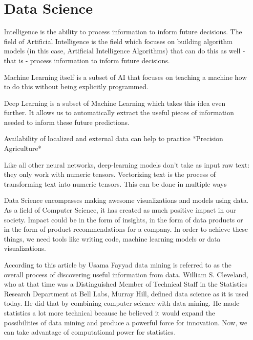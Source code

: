 \section{Data Science}



Intelligence is the ability to process information to inform future decisions. The field of Artificial Intelligence is the field which focuses on building algorithm models (in this case, Artificial Intelligence \cite{black2009books} Algorithms) that can do this as well - that is - process information to inform future decisions.

Machine Learning itself is a subset of AI that focuses on teaching a machine how to do this without being explicitly programmed. 

Deep Learning is a subset of Machine Learning which takes this idea even further. It allows us to automatically extract the useful pieces of information needed to inform these future predictions.

Availability of localized and external data can help to practice *Precision Agriculture*

Like all other neural networks, deep-learning models don't take as input raw text:
they only work with numeric tensors. Vectorizing text is the process of transforming text
into numeric tensors. This can be done in multiple ways


Data Science encompasses making awesome visualizations and models using data. As a field of Computer Science, it has created as much positive impact in our society. Impact could be in the form of insights, in the form of data products or in the form of product recommendations for a company. In order to achieve these things, we need tools like writing code, machine learning models or data visualizations.


According to this article by Usama Fayyad \cite{fayyad1996data} data mining is referred to  as the overall process of discovering useful information from data. William S. Cleveland, \cite{cleveland2001data}   who at that time was a Distinguished Member of Technical Staff in the Statistics Research Department at Bell Labs, Murray Hill, defined data science as it is used today. He did that by combining computer science with data mining. He made statistics a lot more technical because he believed it would expand the possibilities of data mining and produce a powerful force for innovation. Now, we can take advantage of computational power for statistics.



